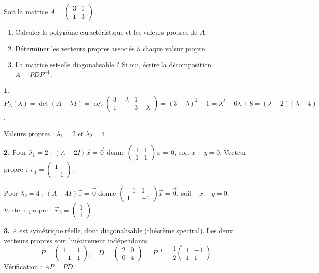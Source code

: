 \documentclass[12pt,a4paper]{article}
\begin{document}
\begin{boiteexercice}
Soit la matrice $A = \begin{pmatrix}3&1\\1&3\end{pmatrix}$.
\begin{enumerate}
  \item Calculer le polynôme caractéristique et les valeurs propres de $A$.
  \item Déterminer les vecteurs propres associés à chaque valeur propre.
  \item La matrice est-elle diagonalisable ? Si oui, écrire la décomposition $A = PDP^{-1}$.
\end{enumerate}
\end{boiteexercice}

\begin{boitecorrige}
\textbf{1.} $P_A(\lambda) = \det(A-\lambda I) = \det\begin{pmatrix}3-\lambda&1\\1&3-\lambda\end{pmatrix} = (3-\lambda)^2-1 = \lambda^2-6\lambda+8 = (\lambda-2)(\lambda-4)$.

Valeurs propres : $\lambda_1 = 2$ et $\lambda_2 = 4$.

\textbf{2.}
Pour $\lambda_1 = 2$ : $(A-2I)\vec{x}=\vec{0}$ donne $\begin{pmatrix}1&1\\1&1\end{pmatrix}\vec{x}=\vec{0}$, soit $x+y=0$. Vecteur propre : $\vec{v}_1 = \begin{pmatrix}1\\-1\end{pmatrix}$.

Pour $\lambda_2 = 4$ : $(A-4I)\vec{x}=\vec{0}$ donne $\begin{pmatrix}-1&1\\1&-1\end{pmatrix}\vec{x}=\vec{0}$, soit $-x+y=0$. Vecteur propre : $\vec{v}_2 = \begin{pmatrix}1\\1\end{pmatrix}$.

\textbf{3.} $A$ est symétrique réelle, donc diagonalisable (théorème spectral). Les deux vecteurs propres sont linéairement indépendants.
\[
P = \begin{pmatrix}1&1\\-1&1\end{pmatrix}, \quad D = \begin{pmatrix}2&0\\0&4\end{pmatrix}, \quad P^{-1} = \frac{1}{2}\begin{pmatrix}1&-1\\1&1\end{pmatrix}
\]
Vérification : $AP = PD$.
\end{boitecorrige}
\end{document}
